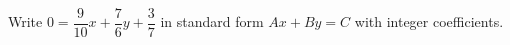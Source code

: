 Write $0=\dfrac{9}{10}x+\dfrac{7}{6}y+\dfrac{3}{7}$ in standard form $Ax+By=C$ with integer coefficients.
